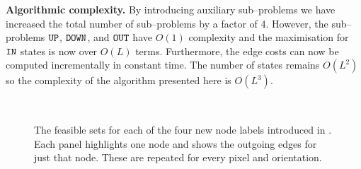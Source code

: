 \textbf{Algorithmic complexity.} By introducing auxiliary
sub--problems we have increased the total number of sub--problems by a
factor of 4. However, the sub--problems $\UPlabel$, $\DOWNlabel$, and
$\OUTlabel$ have $O(1)$ complexity and the maximisation for $\INlabel$
states is now over $O(L)$ terms. Furthermore, the edge costs can now
be computed incrementally in constant time. The number of states
remains $O(L^2)$ so the complexity of the algorithm presented here is
$O(L^3)$.

\begin{figure}
  \centering
  \quad
  \\
  \quad
  \caption{The feasible sets for each of the four new node labels
    introduced in . Each panel highlights one
    node and shows the outgoing edges for just that node. These are
    repeated for every pixel and orientation.}
  \label{fig:aux-feasible-sets}
\end{figure}





